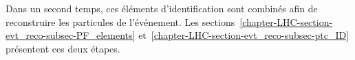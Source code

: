 Dans un second temps, ces éléments d'identification sont combinés afin de reconstruire les particules de l'événement.
Les sections~\ref{chapter-LHC-section-evt_reco-subsec-PF_elements} et~\ref{chapter-LHC-section-evt_reco-subsec-ptc_ID} présentent ces deux étapes.




